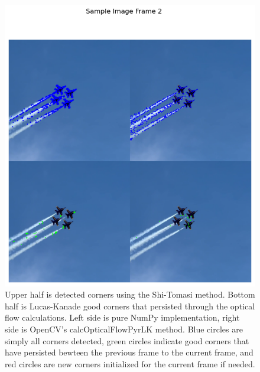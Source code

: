 \documentclass[11pt, conference, letterpaper]{IEEEtran}
\begin{document}
\begin{figure}[h]
    \centering
    \includegraphics[width=0.8\linewidth]{images/sample_image_2.png}
    \caption{Upper half is detected corners using the Shi-Tomasi method. Bottom half is Lucas-Kanade good corners that persisted through the optical flow calculations. Left side is pure NumPy implementation, right side is OpenCV's calcOpticalFlowPyrLK method. Blue circles are simply all corners detected, green circles indicate good corners that have persisted bewteen the previous frame to the current frame, and red circles are new corners initialized for the current frame if needed.}
    \label{fig:sample_3}
\end{figure}
\end{document}
